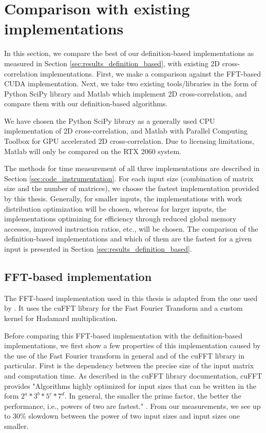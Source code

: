 \section{Comparison with existing implementations}

In this section, we compare the best of our definition-based implementations as measured in Section \ref{sec:results_definition_based}, with existing 2D cross-correlation implementations. First, we make a comparison against the FFT-based CUDA implementation. Next, we take two existing tools/libraries in the form of Python SciPy \citet{journal:scipy} library and Matlab \citep{site:matlab} which implement 2D cross-correlation, and compare them with our definition-based algorithms.

We have chosen the Python SciPy library as a generally used CPU implementation of 2D cross-correlation, and Matlab with Parallel Computing Toolbox for GPU accelerated 2D cross-correlation. Due to licensing limitations, Matlab will only be compared on the RTX 2060 system.

The methods for time measurement of all three implementations are described in Section \ref{sec:code_instrumentation}. For each input size (combination of matrix size and the number of matrices), we choose the fastest implementation provided by this thesis. Generally, for smaller inputs, the implementations with work distribution optimization will be chosen, whereas for larger inputs, the implementations optimizing for efficiency through reduced global memory accesses, improved instruction ratios, etc., will be chosen. The comparison of the definition-based implementations and which of them are the fastest for a given input is presented in Section \ref{sec:results_definition_based}. 

\subsection{FFT-based implementation}
\label{sec:results_fft_based}

The FFT-based implementation used in this thesis is adapted from the one used by \citet{misko}. It uses the cuFFT library for the Fast Fourier Transform and a custom kernel for Hadamard multiplication. 

Before comparing this FFT-based implementation with the definition-based implementations, we first show a few properties of this implementation caused by the use of the Fast Fourier transform in general and of the cuFFT library in particular. First is the dependency between the precise size of the input matrix and computation time. As described in the cuFFT library documentation, cuFFT provides "Algorithms highly optimized for input sizes that can be written in the form $2^{a}*3^{b}*5^{c}*7^{d}$. In general, the smaller the prime factor, the better the performance, i.e., powers of two are fastest." \citep{site:cufft}. From our measurements, we see up to 30\% 
slowdown between the power of two input sizes and input sizes one smaller. 

